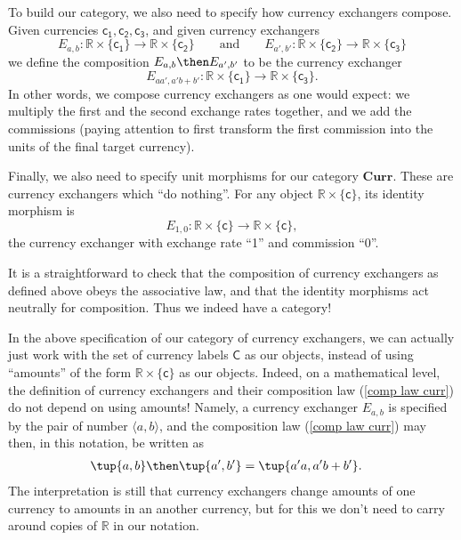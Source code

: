 To build our category, we also need to specify how currency exchangers compose. Given currencies $\mathsf{c_1}, \mathsf{c_2}, \mathsf{c_3}$, and given currency exchangers
$$
E_{a,b} : \mathbb{R} \times \{\mathsf{c_1} \} \rightarrow \mathbb{R} \times \{ \mathsf{c_2}\}
\qquad \text{and} \qquad
E_{a',b'} : \mathbb{R} \times \{\mathsf{c_2}\} \rightarrow \mathbb{R} \times \{\mathsf{c_3}\}
$$
we define the composition $E_{a,b} \then E_{a',b'}$ to be the currency exchanger
\begin{equation}\label{comp law curr}
E_{aa',a'b + b'} : \mathbb{R} \times \{\mathsf{c_1}\} \rightarrow \mathbb{R} \times \{\mathsf{c_3}\}.
\end{equation}
In other words, we compose currency exchangers as one would expect: we multiply the first and the second exchange rates together, and we add the commissions (paying attention to first transform the first commission into the units of the final target currency).

Finally, we also need to specify unit morphisms for our category $\mathbf{Curr}$. These are currency exchangers which ``do nothing''. For any object $\mathbb{R} \times \{ \mathsf{c}\}$, its identity morphism is 
$$
E_{1,0} : \mathbb{R} \times \{\mathsf{c}\} \rightarrow \mathbb{R} \times \{\mathsf{c}\},
$$
the currency exchanger with exchange rate ``1''  and commission ``0''. 

It is a straightforward to check that the composition of currency exchangers as defined above obeys the associative law, and that the identity morphisms act neutrally for composition. Thus we indeed have a category!

\begin{remark}
In the above specification of our category of currency exchangers, we can actually just work with the set of currency labels $\mathsf{C}$ as our objects, instead of using ``amounts'' of the form $\mathbb{R} \times \{\mathsf{c}\}$ as our objects. Indeed, on a mathematical level, the definition of currency exchangers and their composition law (\ref{comp law curr}) do not depend on using amounts! Namely, a currency exchanger $E_{a,b}$ is specified by the pair of number $\langle a, b \rangle$, and the composition law (\ref{comp law curr}) may then, in this notation, be written as 
\begin{equation}
\begin{aligned}
\label{eq:currencycomp}
    \tup{a,b}\then \tup{a',b'}&=\tup{a' a, a' b + b'}.
\end{aligned}
\end{equation}
The interpretation is still that currency exchangers change amounts of one currency to amounts in an another currency, but for this we don't need to carry around copies of $\mathbb{R}$ in our notation.
\end{remark}

